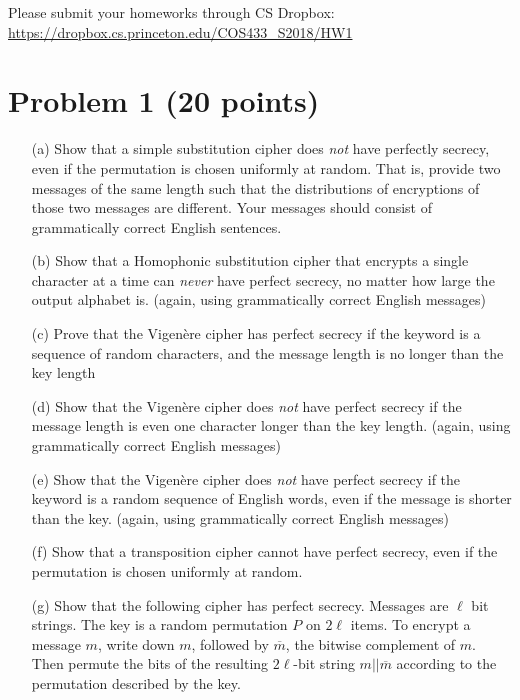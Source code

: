 




Please submit your homeworks through CS Dropbox:\\ \url{https://dropbox.cs.princeton.edu/COS433_S2018/HW1}

\section{Problem 1 (20 points)}

\begin{itemize}
	\item[(a)] Show that a simple substitution cipher does \emph{not} have perfectly secrecy, even if the permutation is chosen uniformly at random.  That is, provide two messages of the same length such that the distributions of encryptions of those two messages are different.  Your messages should consist of grammatically correct English sentences. 
	\item[(b)] Show that a Homophonic substitution cipher that encrypts a single character at a time can \emph{never} have perfect secrecy, no matter how large the output alphabet is.  (again, using grammatically correct English messages) 
	\item[(c)] Prove that the Vigen\`ere cipher has perfect secrecy if the keyword is a sequence of random characters, and the message length is no longer than the key length
	\item[(d)] Show that the Vigen\`ere cipher does \emph{not} have perfect secrecy if the message length is even one character longer than the key length.  (again, using grammatically correct English messages)
	\item[(e)] Show that the Vigen\`ere cipher does \emph{not} have perfect secrecy if the keyword is a random sequence of English words, even if the message is shorter than the key.  (again, using grammatically correct English messages)
	\item[(f)] Show that a transposition cipher cannot have perfect secrecy, even if the permutation is chosen uniformly at random.
	\item[(g)] Show that the following cipher has perfect secrecy.  Messages are $\ell$ bit strings.  The key is a random permutation $P$ on $2\ell$ items.  To encrypt a message $m$, write down $m$, followed by $\overline{m}$, the bitwise complement of $m$.  Then permute the bits of the resulting $2\ell$-bit string $m||\overline{m}$ according to the permutation described by the key.
\end{itemize}



